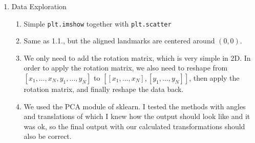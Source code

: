 \documentclass[
    a4paper,
    12pt,
    parskip=half,
]{scrarticle}
\begin{document}
\begin{enumerate}
    \item Data Exploration
    \begin{enumerate}[label=\theenumi.\arabic*.]
        \item Simple \texttt{plt.imshow} together with \texttt{plt.scatter}
        \item Same as 1.1., but the aligned landmarks are centered around \((0, 0)\).
        \item We only need to add the rotation matrix, which is very simple in 2D. In order to apply the rotation matrix,
        we also need to reshape from \([x_1, \ldots , x_N, y_1, \ldots, y_N]\) to \([[x_1, \ldots, x_N], [y_1, \ldots, y_N]]\), then apply
        the rotation matrix, and finally reshape the data back.
        \item We used the PCA module of sklearn.
        I tested the methods with angles and translations of which I knew how the output should look like and it was ok,
        so the final output with our calculated transformations should also be correct.
    \end{enumerate}


\end{enumerate}
\end{document}
